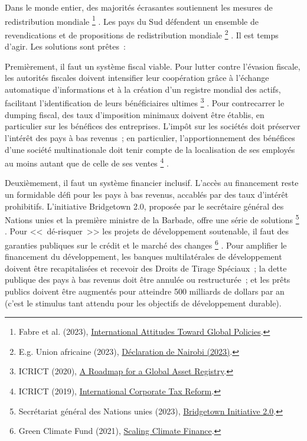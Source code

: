 \documentclass[a5paper,french,openany]{memoir}
\begin{document}
Dans le monde entier, des majorités écrasantes soutiennent les mesures de redistribution mondiale
\footnote{Fabre et al. (2023), \href{https://papers.ssrn.com/sol3/papers.cfm?abstract\_id=4448523}{International Attitudes Toward Global Policies}.}%
. Les pays du Sud défendent un ensemble de revendications et de propositions de redistribution mondiale
\footnote{E.g. Union africaine (2023), \href{https://media.africaclimatesummit.org/NAIROBI+Declaration+FURTHER+edited+060923+EN+920AM.pdf}{Déclaration de Nairobi (2023)}.}%
. Il est temps d'agir. Les solutions sont prêtes~:

Premièrement, il faut un système fiscal viable. Pour lutter contre l'évasion fiscale, les autorités fiscales doivent intensifier leur coopération grâce à l'échange automatique d'informations et à la création d'un registre mondial des actifs, facilitant l'identification de leurs bénéficiaires ultimes
\footnote{ICRICT (2020), \href{https://static1.squarespace.com/static/5a0c602bf43b5594845abb81/t/5c988368eef1a1538c2ae7eb/1553498989927/GAR.pdf}{A Roadmap for a Global Asset Registry}.}%
. Pour contrecarrer le dumping fiscal, des taux d'imposition minimaux doivent être établis, en particulier sur les bénéfices des entreprises. L'impôt sur les sociétés doit préserver l'intérêt des pays à bas revenus~; en particulier, l'apportionnement des bénéfices d'une société multinationale doit tenir compte de la localisation de ses employés au moins autant que de celle de ses ventes
\footnote{ICRICT (2019), \href{https://static1.squarespace.com/static/5a0c602bf43b5594845abb81/t/5d979e6dc5f7cb7b66842c49/1570217588721/ICRICT-INTERNATIONAL+CORPORATE+TAX+REFORM.pdf}{International Corporate Tax Reform}.}%
. 

Deuxièmement, il faut un système financier inclusif. L'accès au financement reste un formidable défi pour les pays à bas revenus, accablés par des taux d'intérêt prohibitifs. L'initiative Bridgetown 2.0, proposée par le secrétaire général des Nations unies et la première ministre de la Barbade, offre une série de solutions
\footnote{Secrétariat général des Nations unies (2023), \href{https://www.un.org/sustainabledevelopment/blog/2023/04/press-release-with-clock-ticking-for-the-sdgs-un-chief-and-barbados-prime-minister-call-for-urgent-action-to-transform-broken-global-financial-system/}{Bridgetown Initiative 2.0}.}%
. Pour <<~dé-risquer~>> les projets de développement soutenable, il faut des garanties publiques sur le crédit et le marché des changes
\footnote{Green Climate Fund (2021), \href{https://www.greenclimate.fund/sites/default/files/document/scaling-climate-finance-context-covid-19-full-report\_0.pdf}{Scaling Climate Finance}.}%
. Pour amplifier le financement du développement, les banques multilatérales de développement doivent être recapitalisées et recevoir des Droits de Tirage Spéciaux~; la dette publique des pays à bas revenus doit être annulée ou restructurée~; et les prêts publics doivent être augmentés pour atteindre 500 milliards de dollars par an (c'est le stimulus tant attendu pour les objectifs de développement durable). 
\end{document}
